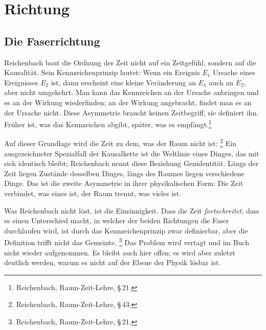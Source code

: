 \chapter{Richtung}

\section{Die Faserrichtung}

Reichenbach baut die Ordnung der Zeit nicht auf ein Zeitgefühl, sondern auf die Kausalität. Sein Kennzeichenprinzip lautet: Wenn ein Ereignis $E_1$ Ursache eines Ereignisses $E_2$ ist, dann erscheint eine kleine Veränderung an $E_1$ auch an $E_2$, aber nicht umgekehrt. Man kann das Kennzeichen an der Ursache anbringen und es an der Wirkung wiederfinden; an der Wirkung angebracht, findet man es an der Ursache nicht. Diese Asymmetrie braucht keinen Zeitbegriff, sie definiert ihn. Früher ist, was das Kennzeichen abgibt, später, was es empfängt.\footnote{Reichenbach, Raum-Zeit-Lehre, \S\,21.}

Auf dieser Grundlage wird die Zeit zu dem, was der Raum nicht ist: \footnote{Reichenbach, Raum-Zeit-Lehre, \S\,43.} Ein ausgezeichneter Spezialfall der Kausalkette ist die Weltlinie eines Dinges, das mit sich identisch bleibt; Reichenbach nennt diese Beziehung Genidentität. Längs der Zeit liegen Zustände desselben Dinges, längs des Raumes liegen verschiedene Dinge. Das ist die zweite Asymmetrie in ihrer physikalischen Form: Die Zeit verbindet, was eines ist, der Raum trennt, was vieles ist.

Was Reichenbach nicht löst, ist die Einsinnigkeit. Dass die Zeit \emph{fortschreitet}, dass es einen Unterschied macht, in welcher der beiden Richtungen die Faser durchlaufen wird, ist durch das Kennzeichenprinzip zwar definierbar, aber die Definition trifft nicht das Gemeinte. \footnote{Reichenbach, Raum-Zeit-Lehre, \S\,21.} Das Problem wird vertagt und im Buch nicht wieder aufgenommen. Es bleibt auch hier offen; es wird aber zuletzt deutlich werden, warum es nicht auf der Ebene der Physik lösbar ist.

